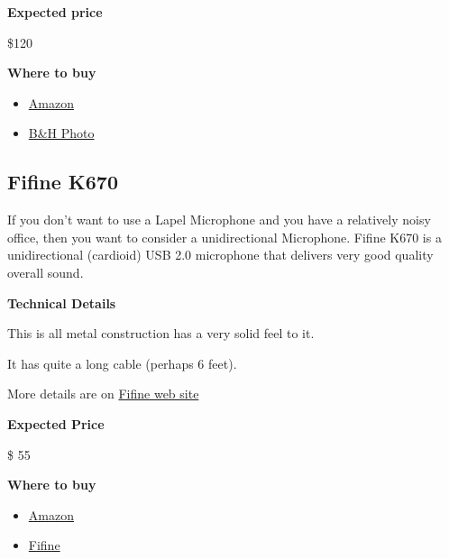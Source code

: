 \begin{gram}
\textbf{Expected price}

\$120

\textbf{Where to buy}

\begin{itemize}

\item \href{https://www.amazon.com/Samson-Wireless-Microphone-System-SWXPD2BLM8/dp/B07HPRZBKC/ref=sr_1_6?crid=3V47B7B3X9SJ5&keywords=wireless+usb+lapel+microphone&qid=1582899680&sprefix=Wireless+USB+lapel+,aps,143&sr=8-6}{Amazon}

\item 
\href{https://www.bhphotovideo.com/c/product/1440151-REG/samson_swxpd2blm8_xpd2_lavalier_usb_wireless.html/?ap=y&ap=y&smp=y&smp=y&lsft=BI%3A514&gclid=EAIaIQobChMIiIOHy-_06QIVUopaBR150wxWEAQYASABEgJL5vD_BwE}{B\&H Photo}
\end{itemize}
\end{gram}

\subsection{Fifine K670}
\label{sec:fifine}

\begin{gram}
\label{grm:fifine::main}
If you don't want to use a Lapel Microphone and you have a relatively
noisy office, then you want to consider a unidirectional Microphone.
Fifine K670 is a unidirectional (cardioid) USB 2.0 microphone that
delivers very good quality overall sound.

\textbf{Technical Details}

This is all metal construction has a very solid feel to it.

It has quite a long cable (perhaps 6 feet).

More details are on \href{https://fifinemicrophone.com/products/usb-microphone-for-mac-and-windows-k670}{Fifine web site}

\textbf{Expected Price}

\$ 55

\textbf{Where to buy}

\begin{itemize}
\item 
\href{https://www.amazon.com/Microphone-FIFINE-Computers-Podcasting-K670/dp/B079HRFH2Y/ref=asc_df_B079HRFH2Y/?tag=hyprod-20&linkCode=df0&hvadid=380013417597&hvpos=&hvnetw=g&hvrand=6999453823816156640&hvpone=&hvptwo=&hvqmt=&hvdev=c&hvdvcmdl=&hvlocint=&hvlocphy=1025202&hvtargid=pla-878206170477&psc=1&language=en_US&tag=&ref=&adgrpid=77922879259&hvpone=&hvptwo=&hvadid=380013417597&hvpos=&hvnetw=g&hvrand=6999453823816156640&hvqmt=&hvdev=c&hvdvcmdl=&hvlocint=&hvlocphy=1025202&hvtargid=pla-878206170477}{Amazon}
\item \href{https://fifinemicrophone.com/products/usb-microphone-for-mac-and-windows-k670}{Fifine}
\end{itemize}
\end{gram}


